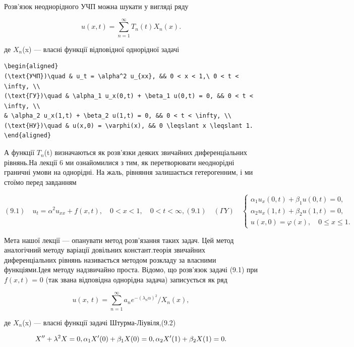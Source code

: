 \documentclass[
  ukrainian,
]{article}
\begin{document}
Розв'язок неоднорідного УЧП можна шукати у вигляді ряду

\[
u(x,t) = \sum_{n=1}^{\infty} T_n(t) X_n(x).
\]

де \(X_n\)(x) --- власні функції відповідної однорідної задачі

\begin{verbatim}
\begin{aligned}
(\text{УЧП})\quad & u_t = \alpha^2 u_{xx}, && 0 < x < 1,\ 0 < t < \infty, \\
(\text{ГУ})\quad & \alpha_1 u_x(0,t) + \beta_1 u(0,t) = 0, && 0 < t < \infty, \\
& \alpha_2 u_x(1,t) + \beta_2 u(1,t) = 0, && 0 < t < \infty, \\
(\text{НУ})\quad & u(x,0) = \varphi(x), && 0 \leqslant x \leqslant 1.
\end{aligned}
\end{verbatim}

А функції \(T_n\)(t) визначаються як розв'язки деяких звичайних
диференціальних рівнянь.На лекції 6 ми ознайомилися з тим, як
перетворювати неоднорідні граничні умови на однорідні. На жаль, рівняння
залишається гетерогенним, і ми стоїмо перед завданням

\[
(9.1) \quad u_{t} = \alpha^{2} u_{xx} + f(x, t), \quad 0 < x < 1, \quad 0 < t < \infty,
(9.1) \quad (\Gamma Y) \quad
\begin{cases} \alpha_{1} u_{x}(0, t) + \beta_{1} u(0, t) = 0, \\ \alpha_{2} u_{x}(1, t) + \beta_{2} u(1, t) = 0, \\ u(x, 0) = \varphi(x), \quad 0 \le x \le 1. \end{cases}
\]

Мета нашої лекції --- опанувати метод розв'язання таких задач. Цей метод
аналогічний методу варіації довільних констант.теорія звичайних
диференціальних рівнянь називається методом розкладу за власними
функціями.Ідея методу надзвичайно проста. Відомо, що розв'язок задачі
(9.1) при \(f(x, t)\) = 0 (так звана відповідна однорідна задача)
записується як ряд

\[
u\left(x,\ t\right)=\sum_{n=1}^{\infty}a_{n}e^{-\left(\lambda_{n}\alpha\right)^{2}}/X_{n}\left(x\right),
\]

де \(X_n\)(x) --- власні функції задачі Штурма-Ліувіля,(9.2)

\[
X'' + \lambda^2 X = 0, \\ \alpha_1 X'(0) + \beta_1 X(0) = 0, \\ \alpha_2 X'(1) + \beta_2 X(1) = 0.
\]
\end{document}
